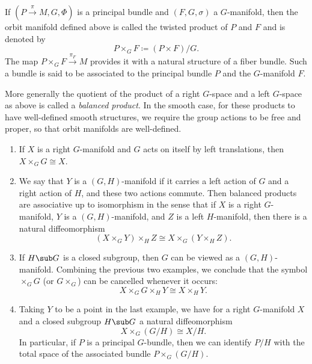 \begin{defn}
    If $(P\overset{\pi}{\to}M,G,\Phi)$ is a principal bundle and  $(F,G,\sigma)$ a $G$-manifold, then the orbit manifold defined above is called the twisted product of $P$ and $F$ and is denoted by
    \[P\times_G F\coloneqq (P\times F)\slash G.\]
    The map $P\times_G F\overset{\pi_F}{\to } M$ provides it with a natural structure of a fiber bundle. Such a bundle is said to be associated to the principal bundle $P$ and the $G$-manifold $F$.
\end{defn}

More generally the quotient of the product of a right $G$-space and a left $G$-space as above is called a \emph{balanced product}. In the smooth case, for these products to have well-defined smooth structures, we require the group actions to be free and proper, so that orbit manifolds are well-defined.

\begin{example}
    \begin{enumerate}
        \item If $X$ is a right $G$-manifold and $G$ acts on itself by left translations, then $X\times_G G\cong X$.
        \item We say that $Y$ is a $(G,H)$-manifold if it carries a left action of $G$ and a right action of $H$, and these two actions commute. Then balanced products are associative up to isomorphism in the sense that if $X$ is a right $G$-manifold, $Y$ is a $(G,H)$-manifold, and $Z$ is a left $H$-manifold, then there is a natural diffeomorphism
        \[(X\times_G Y)\times_H Z\cong X\times_G (Y\times_H Z).\]
        \item If $H\sub G$ is a closed subgroup, then $G$ can be viewed as a $(G,H)$-manifold. Combining the previous two examples, we conclude that the symbol $\times_G G$ (or $G\times_G$) can be cancelled whenever it occurs:
        \[X\times_G G\times_H Y\cong X\times_H Y.\]
        \item Taking $Y$ to be a point in the last example, we have for a right $G$-manifold $X$ and a closed subgroup $H\sub G$ a natural diffeomorphism
        \[X\times_G (G\slash H)\cong X\slash H.\]
        In particular, if $P$ is a principal $G$-bundle, then we can identify $P\slash H$ with the total space of the associated bundle $P\times_G (G\slash H)$.
    \end{enumerate}
\end{example}

